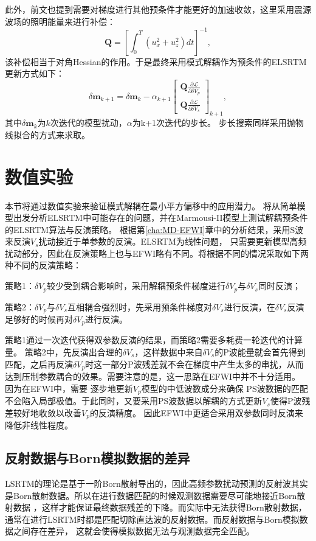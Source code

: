 此外，前文也提到需要对梯度进行其他预条件才能更好的加速收敛，这里采用震源波场的照明能量来进行补偿：
\begin{equation}
	\mathbf{Q} =\left[\int^T_0(u^2_x+u^2_z)dt\right]^{-1},
    \label{eq:Gradient_Illumination_LSRTM}
\end{equation}
该补偿相当于对角Hessian的作用。于是最终采用模式解耦作为预条件的ELSRTM更新方式如下：
\begin{equation}
	\delta\mathbf{m}_{k+1}=\delta\mathbf{m}_{k}-\alpha_{k+1}
        \begin{bmatrix}\mathbf{Q}{\frac{\partial\mathcal{L}}{\partial \delta V_p}}\\
		\mathbf{Q}{\frac{\partial\mathcal{L}}{\partial \delta V_s}}\end{bmatrix}_{k+1},
        \label{eq:Gradientmethod_LSRTM}
\end{equation}
其中$\delta\mathbf{m}_{k}$为$k$次迭代的模型扰动，$\alpha$为k+1次迭代的步长。
步长搜索同样采用抛物线拟合的方式来求取。
\section{数值实验}
本节将通过数值实验来验证模式解耦在最小平方偏移中的应用潜力。
将从简单模型出发分析ELSRTM中可能存在的问题，并在Marmousi-II模型上测试解耦预条件的ELSRTM算法与反演策略。
根据第\ref{cha:MD-EFWI}章中的分析结果，采用S波来反演$V_s$扰动接近于单参数的反演。ELSRTM为线性问题，
只需要更新模型高频扰动部分，因此在反演策略上也与EFWI略有不同。将根据不同的情况采取如下两种不同的反演策略：

策略1：$\delta V_p$较少受到耦合影响时，采用解耦预条件梯度进行$\delta V_p$与$\delta V_s$同时反演；

策略2：$\delta V_p$与$\delta V_s$互相耦合强烈时，先采用预条件梯度对$\delta V_s$进行反演，在$\delta
V_s$反演足够好的时候再对$\delta V_p$进行反演。

策略1通过一次迭代获得双参数反演的结果，而策略2需要多耗费一轮迭代的计算量。
策略2中，先反演出合理的$\delta V_s$，这样数据中来自$\delta
V_s$的P波能量就会首先得到匹配，之后再反演$\delta
V_p$时这一部分P波残差就不会在梯度中产生太多的串扰，从而达到压制参数耦合的效果。需要注意的是，这一思路在EFWI中并不十分适用。
因为在EFWI中，需要
逐步地更新$V_p$模型的中低波数成分来确保
PS波数据的匹配不会陷入局部极值。于此同时，又要采用PS波数据以解耦的方式更新$V_s$使得P波残差较好地收敛以改善$V_p$的反演精度。
因此EFWI中更适合采用双参数同时反演来降低非线性程度。
\subsection{反射数据与Born模拟数据的差异}
LSRTM的理论是基于一阶Born散射导出的，因此高频参数扰动预测的反射波其实是Born散射数据。所以在进行数据匹配的时候观测数据需要尽可能地接近Born散射数据
，这样才能保证最终数据残差的下降。而实际中无法获得Born散射数据，通常在进行LSRTM时都是匹配切除直达波的反射数据。而反射数据与Born模拟数据之间存在差异，
这就会使得模拟数据无法与观测数据完全匹配。

